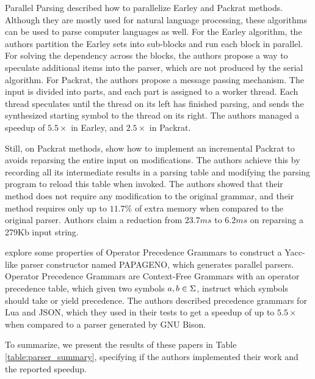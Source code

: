 \begin{section}{Parallel Parsing}
\cite{fowler2009parallel} described how to parallelize Earley
\citep{earley1970efficient} and Packrat \citep{ford2002packrat} methods.
Although they are mostly used for natural language processing, these algorithms
can be used to parse computer languages as well.  For the Earley algorithm, the
authors partition the Earley sets into sub-blocks and run each block in
parallel. For solving the dependency across the blocks, the authors propose a
way to speculate additional items into the parser, which are not produced by
the serial algorithm. For Packrat, the authors propose a message passing
mechanism.  The input is divided into parts, and each part is assigned to a
worker thread. Each thread speculates until the thread on its left has finished
parsing, and sends the synthesized starting symbol to the thread on its right.
The authors managed a speedup of $5.5\times$ in Earley, and $2.5\times$ in
Packrat.

Still, on Packrat methods, \cite{dubroy2017incremental} show how to implement
an incremental Packrat to avoids reparsing the entire input on modifications.
The authors achieve this by recording all its intermediate results in a parsing
table and modifying the parsing program to reload this table when invoked. The
authors showed that their method does not require any modification to the
original grammar, and their method requires only up to $11.7\%$ of extra memory
when compared to the original parser. Authors claim a reduction from $23.7ms$
to $6.2ms$ on reparsing a 279Kb input string.

\cite{Barenghi:2015:PPM:2839536.2840146} explore some properties of Operator
Precedence Grammars to construct a Yacc-like parser constructor named PAPAGENO,
which generates parallel parsers. Operator Precedence Grammars are Context-Free
Grammars with an operator precedence table, which given two symbols $a, b \in
\Sigma$, instruct which symbols should take or yield precedence. The authors
described precedence grammars for Lua and JSON, which they used in their tests
to get a speedup of up to $5.5\times$ when compared to a parser generated by
GNU Bison.

To summarize, we present the results of these papers in Table
\ref{table:parser_summary}, specifying if the authors implemented their work
and the reported speedup.


\end{section}
